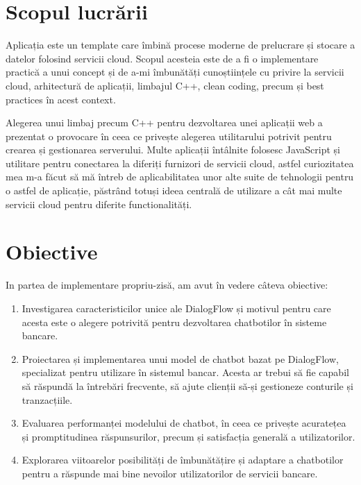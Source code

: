 \section{Scopul lucrării}

Aplicația este un template care îmbină procese moderne de prelucrare și stocare a datelor folosind servicii cloud. Scopul acesteia este de a fi o implementare practică a unui concept și de a-mi îmbunătăți cunoștiințele cu privire la servicii cloud, arhitectură de aplicații, limbajul C++, clean coding, precum și best practices în acest context. 

Alegerea unui limbaj precum C++ pentru dezvoltarea unei aplicații web a prezentat o provocare în ceea ce privește alegerea utilitarului potrivit pentru crearea și gestionarea serverului. Multe aplicații întâlnite folosesc JavaScript și utilitare pentru conectarea la diferiți furnizori de servicii cloud, astfel curiozitatea mea m-a făcut să mă întreb de aplicabilitatea unor alte suite de tehnologii pentru o astfel de aplicație, păstrând totuși ideea centrală de utilizare a cât mai multe servicii cloud pentru diferite functionalități.

\section{Obiective}

In partea de implementare propriu-zisă, am avut în vedere câteva obiective:

\begin{enumerate}
    \item Investigarea caracteristicilor unice ale DialogFlow și motivul pentru care acesta este o alegere potrivită pentru dezvoltarea chatbotilor în sisteme bancare.
    \item Proiectarea și implementarea unui model de chatbot bazat pe DialogFlow, specializat pentru utilizare în sistemul bancar. Acesta ar trebui să fie capabil să răspundă la întrebări frecvente, să ajute clienții să-și gestioneze conturile și tranzacțiile.
    \item Evaluarea performanței modelului de chatbot, în ceea ce privește acuratețea și promptitudinea răspunsurilor, precum și satisfacția generală a utilizatorilor.
    \item Explorarea viitoarelor posibilități de îmbunătățire și adaptare a chatbotilor pentru a răspunde mai bine nevoilor utilizatorilor de servicii bancare.
\end{enumerate}

